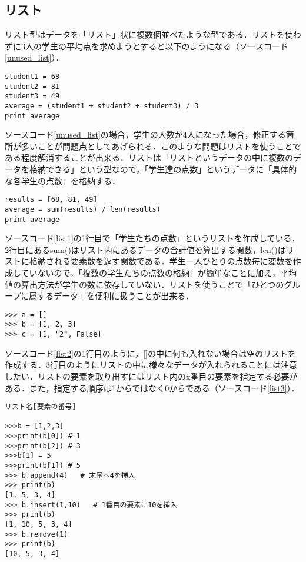 \subsection{リスト}
リスト型はデータを「リスト」状に複数個並べたような型である．リストを使わずに3人の学生の平均点を求めようとすると以下のようになる（ソースコード\ref{unused_list}）．
\begin{lstlisting}[caption=リストを使わない場合, label=unused_list]
student1 = 68
student2 = 81
student3 = 49
average = (student1 + student2 + student3) / 3
print average
\end{lstlisting}
ソースコード\ref{unused_list}の場合，学生の人数が4人になった場合，修正する箇所が多いことが問題点としてあげられる．このような問題はリストを使うことである程度解消することが出来る．リストは「リストというデータの中に複数のデータを格納できる」という型なので，「学生達の点数」というデータに「具体的な各学生の点数」を格納する．
\begin{lstlisting}[caption=リストを使った場合, label=list1]
results = [68, 81, 49]
average = sum(results) / len(results)
print average
\end{lstlisting}
ソースコード\ref{list1}の1行目で「学生たちの点数」というリストを作成している．2行目にあるsum()はリスト内にあるデータの合計値を算出する関数，len()はリストに格納される要素数を返す関数である．学生一人ひとりの点数毎に変数を作成していないので，「複数の学生たちの点数の格納」が簡単なことに加え，平均値の算出方法が学生の数に依存していない．リストを使うことで「ひとつのグループに属するデータ」を便利に扱うことが出来る．
\begin{lstlisting}[caption=リストの使い方1, label=list2]
>>> a = []
>>> b = [1, 2, 3]
>>> c = [1, "2", False]
\end{lstlisting}
ソースコード\ref{list2}の1行目のように，[]の中に何も入れない場合は空のリストを作成する．3行目のようにリストの中に様々なデータが入れられることには注意したい．リストの要素を取り出すにはリスト内のx番目の要素を指定する必要がある．また，指定する順序は1からではなく0からである（ソースコード\ref{list3}）．
\begin{lstlisting}[caption=リストの使い方2, label=list3]
リスト名[要素の番号]

>>>b = [1,2,3]
>>>print(b[0]) # 1
>>>print(b[2]) # 3
>>>b[1] = 5
>>>print(b[1]) # 5
>>> b.append(4)   # 末尾へ4を挿入
>>> print(b)
[1, 5, 3, 4]
>>> b.insert(1,10)   # 1番目の要素に10を挿入
>>> print(b)
[1, 10, 5, 3, 4]
>>> b.remove(1)
>>> print(b)
[10, 5, 3, 4]
\end{lstlisting}

